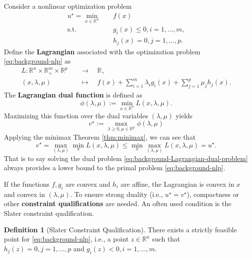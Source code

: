 \documentclass[
]{book}
\theoremstyle{definition}
\newtheorem{definition}{Definition}[chapter]
\theoremstyle{definition}
\theoremstyle{definition}
\theoremstyle{definition}
\theoremstyle{remark}
\begin{document}
Consider a nonlinear optimization problem
\begin{equation}
\begin{split}
u^\star = \min_{x \in \mathbb{R}^{n}} & \quad f(x) \\
\mathrm{s.t.}& \quad g_i(x) \leq 0, i=1,\dots,m, \\
& \quad h_j(x) = 0, j = 1,\dots,p.
\end{split}
\label{eq:background-nlp}
\end{equation}
Define the \textbf{Lagrangian} associated with the optimization problem \eqref{eq:background-nlp} as
\begin{equation}
\begin{split}
L: \mathbb{R}^{n} \times \mathbb{R}^{m}_{+} \times \mathbb{R}^{p} \quad & \rightarrow \quad \mathbb{R}^{}, \\
(x,\lambda,\mu) \quad & \mapsto \quad f(x) + \sum_{i=1}^m \lambda_i g_i(x) + \sum_{j=1}^p \mu_j h_j(x).
\end{split}
\label{eq:background-Lagrangian}
\end{equation}
The \textbf{Lagrangian dual function} is defined as
\begin{equation}
\phi(\lambda,\mu) := \min_{x \in \mathbb{R}^{n}} L(x,\lambda,\mu).
\label{eq:background-Lagrangian-dual}
\end{equation}
Maximizing this function over the dual variables \((\lambda,\mu)\) yields
\begin{equation}
v^\star := \max_{\lambda \geq 0, \mu \in \mathbb{R}^{p}} \phi(\lambda,\mu)
\label{eq:background-Lagrangian-dual-problem}
\end{equation}
Applying the minimax Theorem \ref{thm:minimax}, we can see that
\[
v^\star = \max_{(\lambda,\mu)} \min_{x} L(x,\lambda,\mu) \leq \min_{x} \max_{(\lambda,\mu)} L(x,\lambda,\mu) = u^\star.
\]
That is to say solving the dual problem \eqref{eq:background-Lagrangian-dual-problem} always provides a lower bound to the primal problem \eqref{eq:background-nlp}.

If the functions \(f,g_i\) are convex and \(h_i\) are affine, the Lagrangian is convex in \(x\) and convex in \((\lambda,\mu)\). To ensure strong duality (i.e., \(u^\star = v^\star\)), compactness or other \textbf{constraint qualifications} are needed. An often used condition is the Slater constraint qualification.

\begin{definition}[Slater Constraint Qualification]
\protect\hypertarget{def:SlaterCQ}{}\label{def:SlaterCQ}There exists a strictly feasible point for \eqref{eq:background-nlp}, i.e., a point \(z \in \mathbb{R}^{n}\) such that \(h_j(z) = 0,j=1,\dots,p\) and \(g_i(z) < 0,i=1,\dots,m\).
\end{definition}
\end{document}
